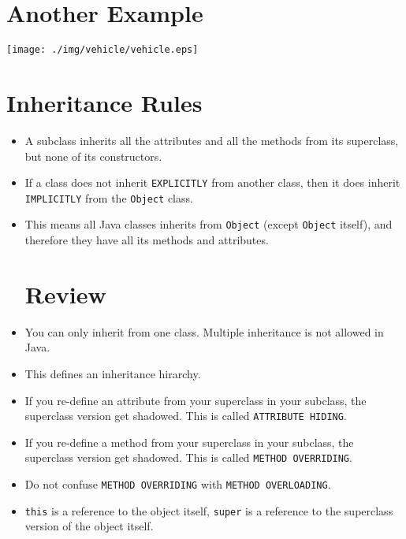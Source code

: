 \documentclass[a4paper, 9pt]{extarticle}
\begin{document}
\section{Another Example}

\begin{center}
  \texttt{[image: ./img/vehicle/vehicle.eps]}
\end{center}

\section{Inheritance Rules}

\begin{itemize}

  \item A subclass inherits all the attributes and all the methods from its
    superclass, but none of its constructors.

  \item If a class does not inherit \verb+EXPLICITLY+ from another class, then
    it does inherit \verb+IMPLICITLY+ from the \verb+Object+ class.

  \item This means all Java classes inherits from \verb+Object+ (except
    \verb+Object+ itself), and therefore they have all its methods and
    attributes.  \section{Review}

  \item You can only inherit from one class. Multiple inheritance is not
    allowed in Java.

  \item This defines an inheritance hirarchy.

  \item If you re-define an attribute from your superclass in your subclass,
    the superclass version get shadowed. This is called \verb+ATTRIBUTE HIDING+.

  \item If you re-define a method from your superclass in your subclass, the
    superclass version get shadowed. This is called \verb+METHOD OVERRIDING+.

  \item Do not confuse \verb+METHOD OVERRIDING+ with \verb+METHOD OVERLOADING+.

  \item \verb+this+ is a reference to the object itself, \verb+super+ is a
    reference to the superclass version of the object itself.


\end{itemize}
\end{document}
